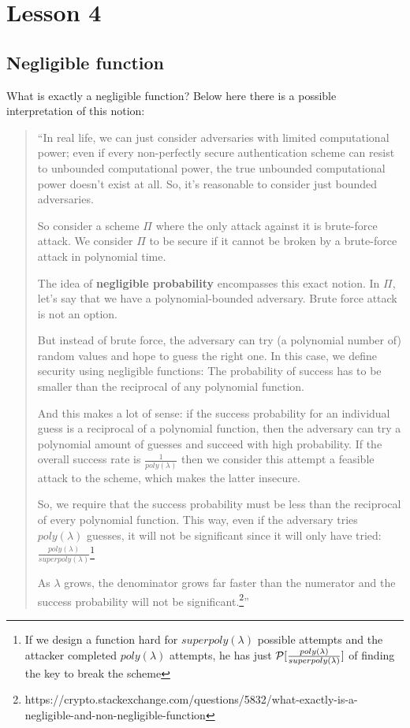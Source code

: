 \chapter*{ Lesson 4}

\section{Negligible function}

What is exactly a negligible function? Below here there is a possible interpretation of this notion:
\begin{quotation}
    ``In real life, we can just consider adversaries with limited computational power; even if every non-perfectly secure authentication scheme can resist to unbounded computational power, the true unbounded computational power doesn't exist at all. So, it's reasonable to consider just bounded adversaries.

    So consider a scheme $\Pi$ where the only attack against it is brute-force attack. We consider $\Pi$ to be secure if it cannot be broken by a brute-force attack in polynomial time.

    The idea of \textbf{negligible probability} encompasses this exact notion. In $\Pi$, let's say that we have a polynomial-bounded adversary. Brute force attack is not an option.

    But instead of brute force, the adversary can try (a polynomial number of) random values and hope to guess the right one. In this case, we define security using negligible functions: The probability of success has to be smaller than the reciprocal of any polynomial function.

    And this makes a lot of sense: if the success probability for an individual guess is a reciprocal of a polynomial function, then the adversary can try a polynomial amount of guesses and succeed with high probability. If the overall success rate is $\frac{1}{poly(\lambda)}$ then we consider this attempt a feasible attack to the scheme, which makes the latter insecure.

    So, we require that the success probability must be less than the reciprocal of every polynomial function. This way, even if the adversary tries $poly(\lambda)$ guesses, it will not be significant since it will only have tried: $\frac{poly(\lambda)}{superpoly(\lambda)}$\footnote{If we design a function hard for $superpoly(\lambda)$ possible attempts and the attacker completed $poly(\lambda)$ attempts, he has just $ \P [\frac{poly(\lambda)}{superpoly(\lambda)}] $ of finding the key to break the scheme}

    As $\lambda$ grows, the denominator grows far faster than the numerator and the success probability will not be significant.\footnote{https://crypto.stackexchange.com/questions/5832/what-exactly-is-a-negligible-and-non-negligible-function}''

\end{quotation}


